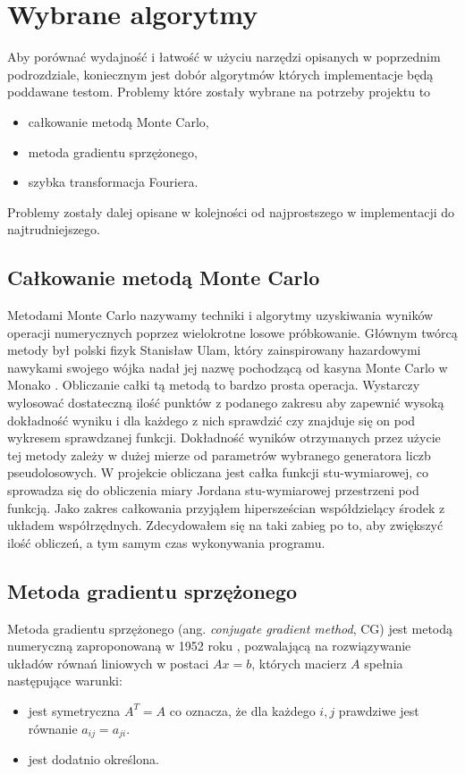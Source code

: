 \documentclass[a4paper,12pt]{book} %
\begin{document}
\section{Wybrane algorytmy}
Aby porównać wydajność i łatwość w użyciu narzędzi opisanych w poprzednim podrozdziale, koniecznym jest dobór algorytmów których implementacje będą poddawane testom. Problemy które zostały wybrane na potrzeby projektu to
\begin{itemize}
\item całkowanie metodą Monte Carlo,
\item metoda gradientu sprzężonego,
\item szybka transformacja Fouriera.
\end{itemize}
Problemy zostały dalej opisane w kolejności od najprostszego w implementacji do najtrudniejszego.
\subsection{Całkowanie metodą Monte Carlo}
Metodami Monte Carlo nazywamy techniki i algorytmy uzyskiwania wyników operacji numerycznych poprzez wielokrotne losowe próbkowanie. Głównym twórcą metody był polski fizyk Stanisław Ulam, który zainspirowany hazardowymi nawykami swojego wójka nadał jej nazwę pochodzącą od kasyna Monte Carlo w Monako \cite{mc_beggining}.
Obliczanie całki tą metodą to bardzo prosta operacja. Wystarczy wylosować dostateczną ilość punktów z podanego zakresu aby zapewnić wysoką dokładność wyniku i dla każdego z nich sprawdzić czy znajduje się on pod wykresem sprawdzanej funkcji. Dokładność wyników otrzymanych przez użycie tej metody zależy w dużej mierze od parametrów wybranego generatora liczb pseudolosowych.
W projekcie obliczana jest całka funkcji stu-wymiarowej, co sprowadza się do obliczenia miary Jordana\cite{miara-jordana} stu-wymiarowej przestrzeni pod funkcją. Jako zakres całkowania przyjąłem hipersześcian współdzielący środek z układem współrzędnych. Zdecydowałem się na taki zabieg po to, aby zwiększyć ilość obliczeń, a tym samym czas wykonywania programu. 
\subsection{Metoda gradientu sprzężonego}
Metoda gradientu sprzężonego (ang. \emph{conjugate gradient method}, CG) jest metodą numeryczną zaproponowaną w 1952 roku \cite{conjugate-gradient}, pozwalającą na rozwiązywanie układów równań liniowych w postaci $Ax = b$, których macierz $A$ spełnia następujące warunki:
\begin{itemize}
\item jest symetryczna $A^T=A$ co oznacza, że dla każdego $i, j$ prawdziwe jest równanie $a_{ij} = a_{ji}.$
\item jest dodatnio określona.
\end{itemize}
\end{document}

